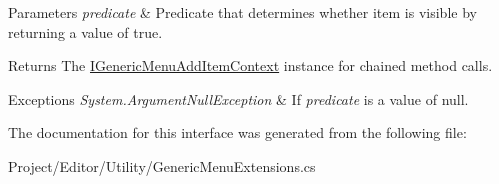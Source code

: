 \begin{DoxyParams}{Parameters}
{\em predicate} & Predicate that determines whether item is visible by returning a value of {\ttfamily true}.\\
\hline
\end{DoxyParams}
\begin{DoxyReturn}{Returns}
The \hyperlink{interface_i_generic_menu_add_item_context}{I\+Generic\+Menu\+Add\+Item\+Context} instance for chained method calls. 
\end{DoxyReturn}

\begin{DoxyExceptions}{Exceptions}
{\em System.\+Argument\+Null\+Exception} & If {\itshape predicate}  is a value of {\ttfamily null}. \\
\hline
\end{DoxyExceptions}


The documentation for this interface was generated from the following file\+:\begin{DoxyCompactItemize}
\item 
Project/\+Editor/\+Utility/Generic\+Menu\+Extensions.\+cs\end{DoxyCompactItemize}

